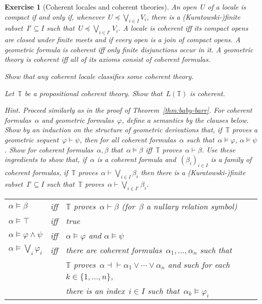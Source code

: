 \documentclass{ws-rv9x6}
\newtheorem{ex}{Exercise}
\newenvironment{exercise}[1]{
  \begin{ex}[#1]
}{\end{ex}}
\newcommand{\TT}{\mathbb{T}}
\renewcommand{\_}{\mathpunct{.}}
\newcommand{\?}{\,{:}\,}
\begin{document}
\begin{exercise}{Coherent locales and coherent theories}%
\label{ex:coherent}%
An open~$U$ of a locale is \emph{compact} if and only if, whenever~$U
\preceq \bigvee_{i \in I} V_i$, there is a (Kuratowski-)finite subset~$I'
\subseteq I$ such that~$U \preceq \bigvee_{i \in I'} V_i$. A locale is
\emph{coherent} iff its compact opens are closed under finite meets and if
every open is a join of compact opens. A geometric formula is \emph{coherent} iff only
finite disjunctions occur in it. A geometric theory is \emph{coherent}
iff all of its axioms consist of coherent formulas.
\begin{alphlist}[(d)]
\item Show that any coherent locale classifies some coherent theory.
\item Let~$\TT$ be a propositional coherent theory. Show that~$L(\TT)$ is
coherent.\smallskip

{\scriptsize\emph{Hint.} Proceed similarly as in the proof of
Theorem~\ref{thm:baby-barr}. For coherent formulas~$\alpha$ and geometric
formulas~$\varphi$, define a semantics by the clauses below. Show by an induction on the
structure of geometric derivations that, if~$\TT$ proves a geometric
sequent~$\varphi \vdash \psi$, then for all coherent formulas~$\alpha$ such
that~$\alpha \models \varphi$, $\alpha \models \psi$. Show for coherent
formulas~$\alpha,\beta$ that~$\alpha \models \beta$ iff~$\TT$ proves~$\alpha
\vdash \beta$. Use these ingredients to show that, if~$\alpha$ is a coherent
formula and~$(\beta_i)_{i \in I}$ is a family of coherent formulas, if~$\TT$
proves~$\alpha \vdash \bigvee_{i \in I} \beta_i$ then there is a
(Kuratowski-)finite subset~$I' \subseteq I$ such that~$\TT$ proves~$\alpha
\vdash \bigvee_{i \in I'} \beta_i$.

\begin{center}\tablefont
\begin{tabular}{@{}l@{\ \ }c@{\ \ }l@{}}
  $\alpha \models \beta$ &iff& $\TT$ proves~$\alpha \vdash \beta$ \qquad(for~$\beta$ a nullary relation symbol) \\
  $\alpha \models \top$ &iff& true \\
  $\alpha \models \varphi \wedge \psi$ &iff& $\alpha \models \varphi$ and $\alpha \models \psi$ \\
  $\alpha \models \bigvee_i \varphi_i$ &iff& there are coherent
  formulas~$\alpha_1,\ldots,\alpha_n$ such that \\ &&\qquad $\TT$ proves~$\alpha \dashv\vdash
  \alpha_1 \vee \cdots \vee \alpha_n$ and such for each~$k \in \{1,\ldots,n\}$,
  \\ &&\qquad\qquad there is an index~$i \in I$ such that~$\alpha_k \models \varphi_i$
\end{tabular}
\end{center}}


\end{alphlist}
\end{exercise}
\end{document}
